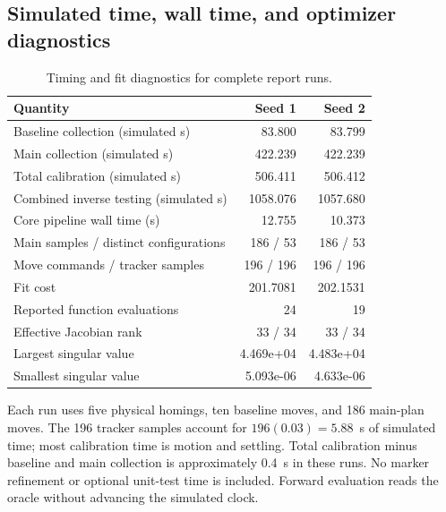 \documentclass[11pt]{article}
\begin{document}
\subsection{Simulated time, wall time, and optimizer diagnostics}
\begin{table}[H]\centering\small\caption{Timing and fit diagnostics for complete report runs.}\begin{tabular}{@{}lrr@{}}\toprule Quantity & Seed 1 & Seed 2\\\midrule

Baseline collection (simulated s) & 83.800 & 83.799\\

Main collection (simulated s) & 422.239 & 422.239\\

Total calibration (simulated s) & 506.411 & 506.412\\

Combined inverse testing (simulated s) & 1058.076 & 1057.680\\

Core pipeline wall time (s) & 12.755 & 10.373\\

Main samples / distinct configurations & 186 / 53 & 186 / 53\\

Move commands / tracker samples & 196 / 196 & 196 / 196\\

Fit cost & 201.7081 & 202.1531\\

Reported function evaluations & 24 & 19\\

Effective Jacobian rank & 33 / 34 & 33 / 34\\

Largest singular value & 4.469e+04 & 4.483e+04\\

Smallest singular value & 5.093e-06 & 4.633e-06\\

\bottomrule\end{tabular}\end{table}
Each run uses five physical homings, ten baseline moves, and 186 main-plan moves. The 196 tracker samples account for $196(0.03)=5.88$~s of simulated time; most calibration time is motion and settling. Total calibration minus baseline and main collection is approximately 0.4~s in these runs. No marker refinement or optional unit-test time is included. Forward evaluation reads the oracle without advancing the simulated clock.
\end{document}
